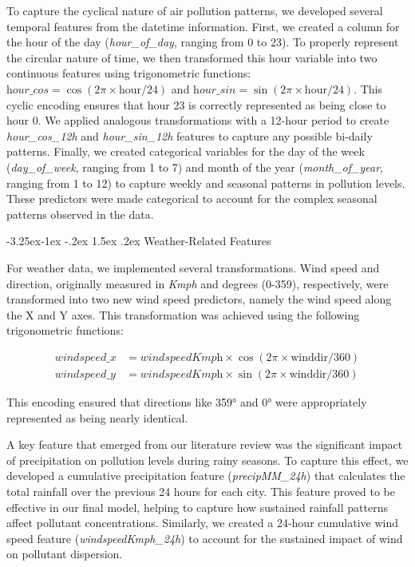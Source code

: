 \documentclass[twoside,11pt]{article}
\makeatletter
\renewcommand\subsubsection{\@startsection{subsubsection}{3}{\z@}%
  {-3.25ex\@plus -1ex \@minus -.2ex}%
  {1.5ex \@plus .2ex}%
  {\normalfont\bfseries\normalsize}}
\makeatother
\begin{document}
To capture the cyclical nature of air pollution patterns, we developed several temporal features from the datetime information. First, we created a column for the hour of the day (\textit{hour\_of\_day}, ranging from 0 to 23). To properly represent the circular nature of time, we then transformed this hour variable into two continuous features using trigonometric functions: $\textit{hour\_cos} = \cos(2\pi \times \text{hour}/24)$ and $\textit{hour\_sin} = \sin(2\pi \times \text{hour}/24)$. This cyclic encoding ensures that hour 23 is correctly represented as being close to hour 0. We applied analogous transformations with a 12-hour period to create \textit{hour\_cos\_12h} and \textit{hour\_sin\_12h} features to capture any possible bi-daily patterns. Finally, we created categorical variables for the day of the week (\textit{day\_of\_week}, ranging from 1 to 7) and month of the year (\textit{month\_of\_year}, ranging from 1 to 12) to capture weekly and seasonal patterns in pollution levels. These predictors were made categorical to account for the complex seasonal patterns observed in the data.

\subsubsection{Weather-Related Features}

For weather data, we implemented several transformations. Wind speed and direction, originally measured in \textit{Kmph} and degrees (0-359), respectively, were transformed into two new wind speed predictors, namely the wind speed along the X and Y axes. This transformation was achieved using the following trigonometric functions:

\begin{align*}
    \textit{windspeed\_x} &= \textit{windspeedKmph} \times \cos(2\pi \times \text{winddir}/360) \\
    \textit{windspeed\_y} &= \textit{windspeedKmph} \times \sin(2\pi \times \text{winddir}/360)
\end{align*}

This encoding ensured that directions like 359° and 0° were appropriately represented as being nearly identical.

A key feature that emerged from our literature review was the significant impact of precipitation on pollution levels during rainy seasons. To capture this effect, we developed a cumulative precipitation feature (\textit{precipMM\_24h}) that calculates the total rainfall over the previous 24 hours for each city. This feature proved to be effective in our final model, helping to capture how sustained rainfall patterns affect pollutant concentrations. Similarly, we created a 24-hour cumulative wind speed feature (\textit{windspeedKmph\_24h}) to account for the sustained impact of wind on pollutant dispersion.
\end{document}
